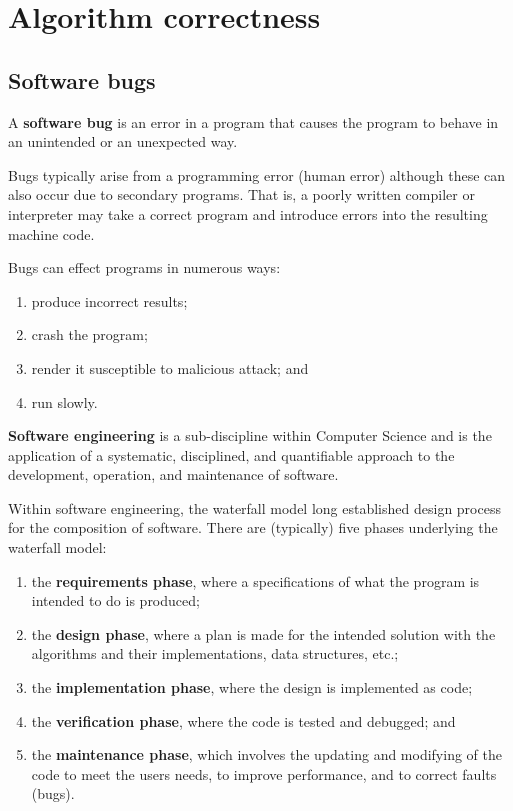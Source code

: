 \chapter{Algorithm correctness}

\section{Software bugs}

\begin{definition}
    A \textbf{software bug} is an error in a program that causes the program to behave in an unintended or an unexpected way.
\end{definition}

Bugs typically arise from a programming error (human error) although these can also occur due to secondary programs. That is, a poorly written compiler or interpreter may take a correct program and introduce errors into the resulting machine code.

Bugs can effect programs in numerous ways:
\begin{enumerate}
    \item produce incorrect results;
    \item crash the program;
    \item render it susceptible to malicious attack; and
    \item run slowly.
\end{enumerate}

\begin{definition}
    \textbf{Software engineering} is a sub-discipline within Computer Science and is the application of a systematic, disciplined, and quantifiable approach to the development, operation, and maintenance of software.
\end{definition}

\begin{definition}
    Within software engineering, the waterfall model long established design process for the composition of software. There are (typically) five phases underlying the waterfall model:
    \begin{enumerate}
        \item the \textbf{requirements phase}, where a specifications of what the program is intended to do is produced;
        \item the \textbf{design phase}, where a plan is made for the intended solution with the algorithms and their implementations, data structures, etc.;
        \item the \textbf{implementation phase}, where the design is implemented as code;
        \item the \textbf{verification phase}, where the code is tested and debugged; and
        \item the \textbf{maintenance phase}, which involves the updating and modifying of the code to meet the users needs, to improve performance, and to correct faults (bugs).
    \end{enumerate}
\end{definition}

